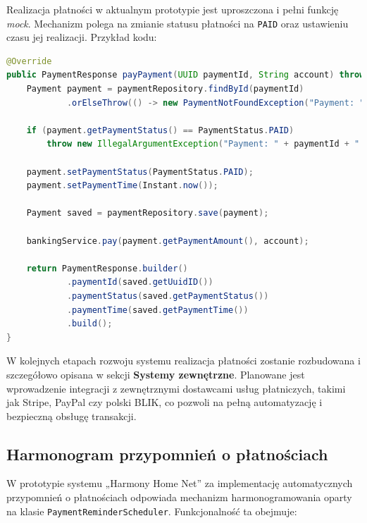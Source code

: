 Realizacja płatności w aktualnym prototypie jest uproszczona i pełni funkcję \emph{mock}. Mechanizm polega na zmianie statusu płatności na \texttt{PAID} oraz ustawieniu czasu jej realizacji. Przykład kodu:

\begin{lstlisting}[language=Java, style=JavaStyle, caption=Fragment metody \texttt{payPayment}]
@Override
public PaymentResponse payPayment(UUID paymentId, String account) throws PaymentNotFoundException {
    Payment payment = paymentRepository.findById(paymentId)
            .orElseThrow(() -> new PaymentNotFoundException("Payment: " + paymentId + " not found"));

    if (payment.getPaymentStatus() == PaymentStatus.PAID)
        throw new IllegalArgumentException("Payment: " + paymentId + " already paid");

    payment.setPaymentStatus(PaymentStatus.PAID);
    payment.setPaymentTime(Instant.now());

    Payment saved = paymentRepository.save(payment);

    bankingService.pay(payment.getPaymentAmount(), account);

    return PaymentResponse.builder()
            .paymentId(saved.getUuidID())
            .paymentStatus(saved.getPaymentStatus())
            .paymentTime(saved.getPaymentTime())
            .build();
}
\end{lstlisting}

W kolejnych etapach rozwoju systemu realizacja płatności zostanie rozbudowana i szczegółowo opisana w sekcji \textbf{Systemy zewnętrzne}. Planowane jest wprowadzenie integracji z zewnętrznymi dostawcami usług płatniczych, takimi jak Stripe, PayPal czy polski BLIK, co pozwoli na pełną automatyzację i bezpieczną obsługę transakcji.

\subsection{Harmonogram przypomnień o płatnościach}

W prototypie systemu „Harmony Home Net” za implementację automatycznych przypomnień o płatnościach odpowiada mechanizm harmonogramowania oparty na klasie \texttt{PaymentReminderScheduler}. Funkcjonalność ta obejmuje:


